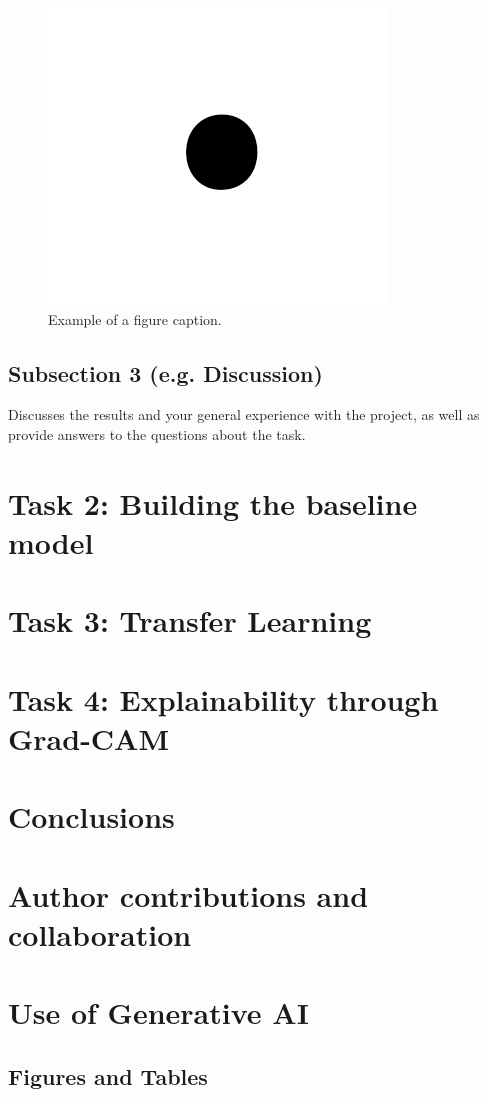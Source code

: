 \documentclass[conference]{IEEEtran}
\begin{document}
\begin{figure}[htbp]
\centerline{\includegraphics{fig1.png}}
\caption{Example of a figure caption.}
\label{fig:example}
\end{figure}
\subsection{Subsection 3 (e.g. Discussion)}
Discusses the results and your general experience with the project, as well as provide answers to the questions about the task.
\section{Task 2: Building the baseline model}
\section{Task 3: Transfer Learning}
\section{Task 4: Explainability through Grad-CAM}
\section{Conclusions}
\section{Author contributions and collaboration}
\section{Use of Generative AI}


\subsection{Figures and Tables}
\end{document}
